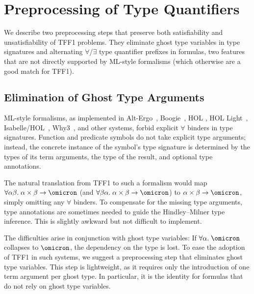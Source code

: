 \section{Preprocessing of Type Quantifiers}

We describe two preprocessing steps that preserve both satisfiability and
unsatisfiability of TFF1 problems. They eliminate ghost type variables in type
signatures and alternating $\forall$/$\exists$ type quantifier prefixes in
formulas, two features that are not directly supported by ML-style formalisms
(which otherwise are a good match for TFF1).

\subsection{Elimination of Ghost Type Arguments} \label{ssec:ghost}


ML-style formalisms, as implemented in Alt-Ergo~\cite{conchon08smt},
Boogie~\cite{Barnett06boogie}, HOL \cite{gordon-melham-1993}, HOL
Light~\cite{harrison-1996}, Isabelle\slash HOL~\cite{nipkow-et-al-2002},
Why3~\cite{boogie11why3}, and other systems, forbid explicit $\forall$ binders
in type signatures. Function and predicate symbols do not take explicit type
arguments; instead, the concrete instance of the symbol's type signature is
determined by the types of its term arguments, the type of the result, and
optional type annotations.

The natural translation from TFF1 to such a formalism would map $\forall
\alpha\beta.\; \alpha\times\beta\to\omicron$ (and $\forall \beta\alpha.\;
\alpha\times\beta\to\omicron$) to $\alpha\times\beta\to\omicron$, simply
omitting any $\forall$ binders. To compensate for the missing type arguments,
type annotations are sometimes needed to guide the Hindley--Milner type
inference. This is slightly awkward but not difficult to implement.

The difficulties arise in conjunction with ghost type variables: If
$\forall\alpha.\;\omicron$ collapses to $\omicron$, the dependency on the type
is lost.
%
To ease the adoption of TFF1 in such systems, we suggest a preprocessing step
that eliminates ghost type variables. This step is lightweight, as it requires
only the introduction of one term argument per ghost type. In particular,
it is the identity for formulas that do not rely on ghost type variables.

